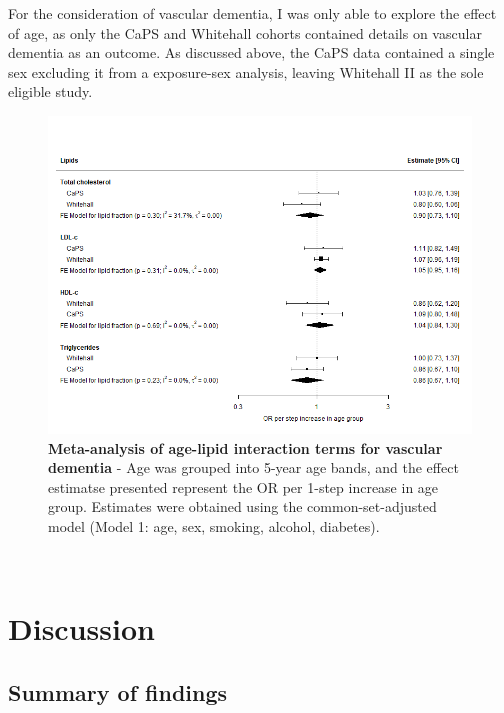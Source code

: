 \documentclass[a4paper, twoside]{templates/ociamthesis}
\begin{document}
For the consideration of vascular dementia, I was only able to explore the effect of age, as only the CaPS and Whitehall cohorts contained details on vascular dementia as an outcome. As discussed above, the CaPS data contained a single sex excluding it from a exposure-sex analysis, leaving Whitehall II as the sole eligible study.





\begin{figure}[H]
\includegraphics[width=1\linewidth]{figures/ipd/interaction_age_vasdem} \caption[Meta-analysis of age-lipid interaction terms for vascular dementia]{\textbf{Meta-analysis of age-lipid interaction terms for vascular dementia} - Age was grouped into 5-year age bands, and the effect estimatse presented represent the OR per 1-step increase in age group. Estimates were obtained using the common-set-adjusted model (Model 1: age, sex, smoking, alcohol, diabetes).}\label{fig:interactionVascularAge}
\end{figure}

~

\hypertarget{discussion-3}{%
\section{Discussion}\label{discussion-3}}

\hypertarget{summary-of-findings-2}{%
\subsection{Summary of findings}\label{summary-of-findings-2}}
\end{document}
